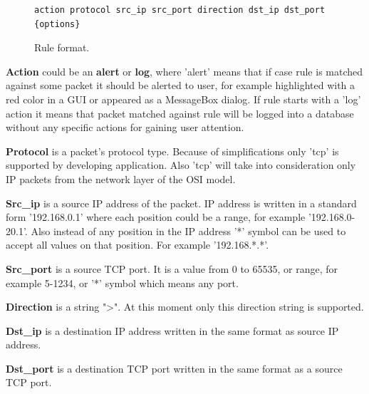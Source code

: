 \documentclass[thesis=M,english]{FITthesis}[2011/07/15]
\begin{document}
\begin{figure}[h]
\centering
\begin{verbatim}
action protocol src_ip src_port direction dst_ip dst_port {options}
\end{verbatim}
\caption{Rule format.}
\label{fig:rule_format}
\end{figure}

\textbf{Action} could be an \textbf{alert} or \textbf{log}, where 'alert' means that if case rule is matched against some packet it should be alerted to user, for example highlighted with a red color in a GUI or appeared as a MessageBox dialog. If rule starts with a 'log' action it means that packet matched against rule will be logged into a database without any specific actions for gaining user attention.

\textbf{Protocol} is a packet's protocol type. Because of simplifications only 'tcp' is supported by developing application. Also 'tcp' will take into consideration only IP packets from the network layer of the OSI model.

\textbf{Src\_ip} is a source IP address of the packet. IP address is written in a standard form '192.168.0.1' where each position could be a range, for example '192.168.0-20.1'. Also instead of any position in the IP address '*' symbol can be used to accept all values on that position. For example '192.168.*.*'.

\textbf{Src\_port} is a source TCP port. It is a value from 0 to 65535, or range, for example 5-1234, or '*' symbol which means any port.

\textbf{Direction} is a string "\textendash\textgreater". At this moment only this direction string is supported.

\textbf{Dst\_ip} is a destination IP address written in the same format as source IP address.

\textbf{Dst\_port} is a destination TCP port written in the same format as a source TCP port.
\end{document}
